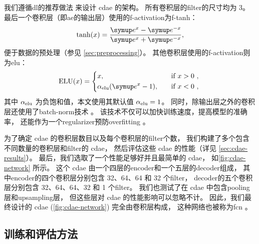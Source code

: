 我们遵循\ac{dl}的推荐做法\cite{geron2017,suganuma2018} 来设计 \ac{cdae} 的架构。
所有卷积层的\ac{filter}的尺寸均为 3。
最后一个卷积层（即\ac{ae}的输出层）使用的\ac{f-activation}为\ac{f-tanh}：
\begin{equation}
  \tanh(x) = \frac{\Ce^x - \Ce^{-x}}{\Ce^x + \Ce^{-x}} ,
\end{equation}
便于数据的预处理（参见 \autoref{sec:preprocessing}）。
其他卷积层使用的\ac{f-activation}则为\ac{elu}\cite{clevert2016}：
\begin{equation}
  \text{ELU}(x) =
    \begin{dcases*}
      x , \quad & if $x > 0$ , \\
      \alpha_{\R{elu}} (\Ce^x - 1) , \quad & if $x < 0$ ,
    \end{dcases*}
\end{equation}
其中 $\alpha_{\mathrm{elu}}$ 为负饱和值，本文使用其默认值 $\alpha_{\mathrm{elu}} = 1$。
同时，除输出层之外的卷积层还使用了\ac{batch-norm}技术 \cite{ioffe2015}。
该技术不仅可以加快训练速度，提高模型的准确率，
还能作为一个\ac{regularizer}预防\ac{overfitting} \cite{geron2017}。

为了确定 \ac{cdae} 的卷积层数目以及每个卷积层的\ac{filter}个数，
我们构建了多个包含不同数量的卷积层和\ac{filter}的 \ac{cdae}，
然后评估这些 \ac{cdae} 的性能（详见 \autoref{sec:cdae-results}）。
最后，我们选取了一个性能足够好并且最简单的 \ac{cdae}，
如\autoref{fig:cdae-network} 所示。
这个 \ac{cdae} 由一个四层的\ac{encoder}和一个五层的\ac{decoder}组成，
其中\ac{encoder}的四个卷积层分别包含 32、64、64 和 32 个\ac{filter}，
\ac{decoder}的五个卷积层分别包含 32、64、64、32 和 1 个\ac{filter}。
我们也测试了在 \ac{cdae} 中包含\ac{pooling}层和\ac{upsampling}层，
但这些层对 \ac{cdae} 的性能影响可以忽略不计。
因此，我们最终设计的 \ac{cdae} (\autoref{fig:cdae-network}) 完全由卷积层构成，
这种网络也被称为\ac{fcn} \cite{long2015,springenberg2015}。

\subsection{训练和评估方法}
\label{sec:train-eval}

